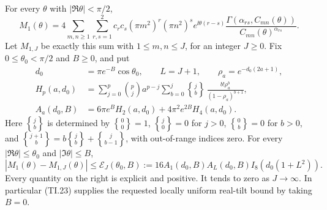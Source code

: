 \begin{theorem}
For every $\theta$ with $|\Re\theta|<\pi/2$,
\begin{equation}
 M_1(\theta)=4\sum_{m,n\ge1}\sum_{r,s=1}^2
 c_rc_s(\pi m^2)^r(\pi n^2)^s e^{\ii\theta(r-s)}
 \frac{\Gamma(\alpha_{rs},C_{mn}(\theta))}
 {C_{mn}(\theta)^{\alpha_{rs}}}. \tag{TI.19}
\end{equation}
Let $M_{1,J}$ be exactly this sum with $1\le m,n\le J$, for an integer
$J\ge0$. Fix $0\le\theta_0<\pi/2$ and $B\ge0$, and put
\begin{align}
 d_0&=\pi e^{-B}\cos\theta_0,\qquad L=J+1,
 \qquad \rho_a=e^{-d_0(2a+1)},\tag{TI.20}\\
 H_p(a,d_0)&=\sum_{j=0}^p\binom pj a^{p-j}
 \sum_{b=0}^j \genfrac{\{}{\}}{0pt}{}{j}{b}\,
 \frac{b!\rho_a^b}{(1-\rho_a)^{b+1}},\tag{TI.21}\\
 A_a(d_0,B)&=6\pi e^B H_2(a,d_0)+4\pi^2e^{2B}H_4(a,d_0).
 \tag{TI.22}
\end{align}
Here $\genfrac{\{}{\}}{0pt}{}{j}{b}$ is determined by $\genfrac{\{}{\}}{0pt}{}{0}{0}=1$,
$\genfrac{\{}{\}}{0pt}{}{j}{0}=0$ for $j>0$, $\genfrac{\{}{\}}{0pt}{}{0}{b}=0$ for $b>0$, and
$\genfrac{\{}{\}}{0pt}{}{j+1}{b}=b\genfrac{\{}{\}}{0pt}{}{j}{b}+\genfrac{\{}{\}}{0pt}{}{j}{b-1}$, with out-of-range
indices zero. For every $|\Re\theta|\le\theta_0$ and
$|\Im\theta|\le B$,
\begin{equation}
 |M_1(\theta)-M_{1,J}(\theta)|
 \le \mathcal E_J(\theta_0,B):=
 16A_1(d_0,B)A_L(d_0,B)I_8(d_0(1+L^2)). \tag{TI.23}
\end{equation}
Every quantity on the right is explicit and positive. It tends to zero
as $J\to\infty$. In particular (TI.23) supplies the requested locally
uniform real-tilt bound by taking $B=0$.
\end{theorem}
